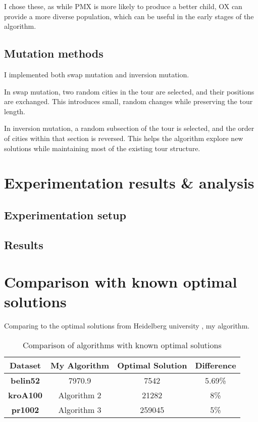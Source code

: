 \documentclass[11pt]{scrartcl} %
\begin{document}
I chose these, as while PMX is more likely to produce a better child, OX can provide a more diverse population, which can be useful in the early stages of the algorithm.

\subsection{Mutation methods}

I implemented both swap mutation and inversion mutation.

In swap mutation, two random cities in the tour are selected, and their positions are exchanged. This introduces small, random changes while preserving the tour length.

In inversion mutation, a random subsection of the tour is selected, and the order of cities within that section is reversed. This helps the algorithm explore new solutions while maintaining most of the existing tour structure.







\section{Experimentation results \& analysis}
\subsection{Experimentation setup}

\subsection{Results}
\subsubsection{}


\section{Comparison with known optimal solutions}
\label{Comparison with known optimal solutions}

Comparing to the optimal solutions from Heidelberg university \cite{heidelberg_university_best_known}, my algorithm.

\begin{table}[h!]
\centering
\begin{tabular}{|c|c|c|c|}
\hline
\textbf{Dataset} & \textbf{My Algorithm} & \textbf{Optimal Solution} & \textbf{Difference} \\ \hline
\textbf{belin52} & 7970.9 & 7542 & 5.69\% \\ \hline
\textbf{kroA100} & Algorithm 2 & 21282 & 8\% \\ \hline
\textbf{pr1002} & Algorithm 3 & 259045 & 5\% \\ \hline
\end{tabular}
\caption{Comparison of algorithms with known optimal solutions}
\label{tab:comparison}
\end{table}
\end{document}
